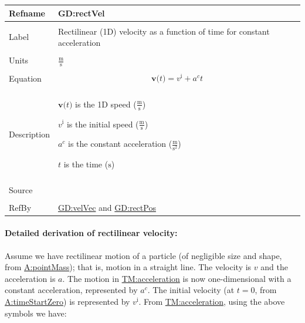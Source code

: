 \documentclass[12pt]{article}
\begin{document}
\vspace{\baselineskip}
\noindent
\begin{minipage}{\textwidth}
\begin{tabular}{>{\raggedright}p{}>{\raggedright\arraybackslash}p{}}
\toprule \textbf{Refname} & \textbf{GD:rectVel}
\label{GD:rectVel}
\\ \midrule \\
Label & Rectilinear (1D) velocity as a function of time for constant acceleration
        
\\ \midrule \\
Units & $\frac{\text{m}}{\text{s}}$
        
\\ \midrule \\
Equation & \begin{displaymath}
           \symbf{v}\text{(}t\text{)}={v^{\text{i}}}+{a^{c}} t
           \end{displaymath}
\\ \midrule \\
Description & \begin{symbDescription}
              \item{$\symbf{v}\text{(}t\text{)}$ is the 1D speed ($\frac{\text{m}}{\text{s}}$)}
              \item{${v^{\text{i}}}$ is the initial speed ($\frac{\text{m}}{\text{s}}$)}
              \item{${a^{c}}$ is the constant acceleration ($\frac{\text{m}}{\text{s}^{2}}$)}
              \item{$t$ is the time (${\text{s}}$)}
              \end{symbDescription}
\\ \midrule \\
Source & \cite[(pg. 8)]{hibbeler2004}
         
\\ \midrule \\
RefBy & \hyperref[GD:velVec]{GD:velVec} and \hyperref[GD:rectPos]{GD:rectPos}
        
\\ \bottomrule
\end{tabular}
\end{minipage}
\paragraph{Detailed derivation of rectilinear velocity:}
\label{GD:rectVelDeriv}
Assume we have rectilinear motion of a particle (of negligible size and shape, from \hyperref[pointMass]{A:pointMass}); that is, motion in a straight line. The velocity is $v$ and the acceleration is $a$. The motion in \hyperref[TM:acceleration]{TM:acceleration} is now one-dimensional with a constant acceleration, represented by ${a^{c}}$. The initial velocity (at $t=0$, from \hyperref[timeStartZero]{A:timeStartZero}) is represented by ${v^{\text{i}}}$. From \hyperref[TM:acceleration]{TM:acceleration}, using the above symbols we have:
\end{document}
